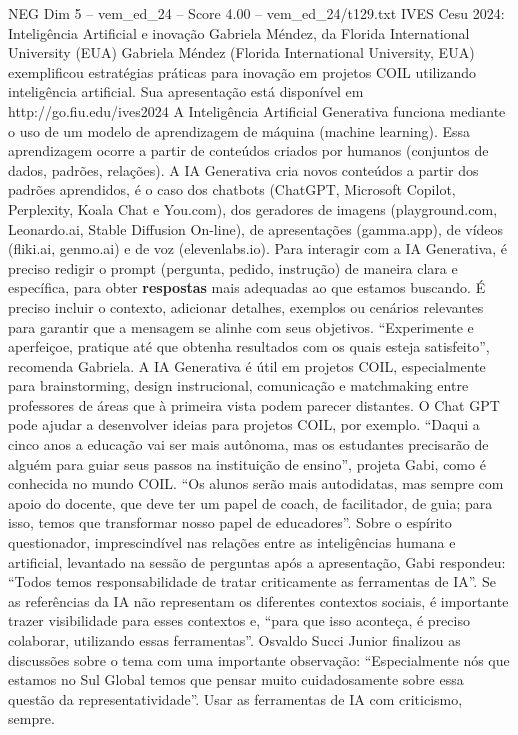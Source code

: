 \begin{textsample}{NEG Dim 5 – vem\_ed\_24 – Score 4.00 – vem\_ed\_24/t129.txt}  \label{ex:f5_neg_151}
IVES Cesu 2024: Inteligência Artificial e inovação Gabriela Méndez, da Florida International University (EUA) Gabriela Méndez (Florida International University, EUA) exemplificou estratégias práticas para inovação em projetos COIL utilizando inteligência artificial.
Sua apresentação está disponível em http://go.fiu.edu/ives2024 A Inteligência Artificial Generativa funciona mediante o uso de um modelo de aprendizagem de máquina (machine learning).
Essa aprendizagem ocorre a partir de conteúdos criados por humanos (conjuntos de dados, padrões, relações).
A IA Generativa cria novos conteúdos a partir dos padrões aprendidos, é o caso dos chatbots (ChatGPT, Microsoft Copilot, Perplexity, Koala Chat e You.com), dos geradores de imagens (playground.com, Leonardo.ai, Stable Diffusion On-line), de apresentações (gamma.app), de vídeos (fliki.ai, genmo.ai) e de voz (elevenlabs.io).
Para interagir com a IA Generativa, é preciso redigir o prompt (pergunta, pedido, instrução) de maneira clara e específica, para obter \textbf{respostas} mais adequadas ao que estamos buscando.
É preciso incluir o contexto, adicionar detalhes, exemplos ou cenários relevantes para garantir que a mensagem se alinhe com seus objetivos. “Experimente e aperfeiçoe, pratique até que obtenha resultados com os quais esteja satisfeito”, recomenda Gabriela.
A IA Generativa é útil em projetos COIL, especialmente para brainstorming, design instrucional, comunicação e matchmaking entre professores de áreas que à primeira vista podem parecer distantes.
O Chat GPT pode ajudar a desenvolver ideias para projetos COIL, por exemplo. “Daqui a cinco anos a educação vai ser mais autônoma, mas os estudantes precisarão de alguém para guiar seus passos na instituição de ensino”, projeta Gabi, como é conhecida no mundo COIL. “Os alunos serão mais autodidatas, mas sempre com apoio do docente, que deve ter um papel de coach, de facilitador, de guia; para isso, temos que transformar nosso papel de educadores”.
Sobre o espírito questionador, imprescindível nas relações entre as inteligências humana e artificial, levantado na sessão de perguntas após a apresentação, Gabi respondeu: “Todos temos responsabilidade de tratar criticamente as ferramentas de IA”.
Se as referências da IA não representam os diferentes contextos sociais, é importante trazer visibilidade para esses contextos e, “para que isso aconteça, é preciso colaborar, utilizando essas ferramentas”.
Osvaldo Succi Junior finalizou as discussões sobre o tema com uma importante observação: “Especialmente nós que estamos no Sul Global temos que pensar muito cuidadosamente sobre essa questão da representatividade”.
Usar as ferramentas de IA com criticismo, sempre.

\end{textsample}
